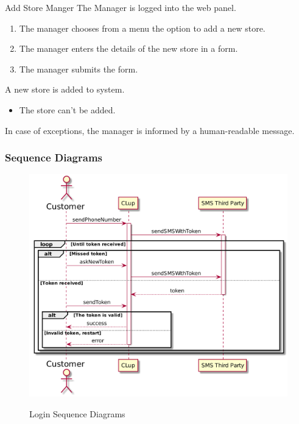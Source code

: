 \usecase
{Add Store}
{Manger}
{The Manager is logged into the web panel.}
{
    \begin{enumerate}
        \item The manager chooses from a menu the option to add a new store.
        \item The manager enters the details of the new store in a form.
        \item The manager submits the form.
    \end{enumerate}
}
{
    A new store is added to system.
}
{
    \begin{itemize}
        \item The store can't be added.
    \end{itemize}
}
{
    In case of exceptions, the manager is informed by a human-readable message.
}


\subsubsection{Sequence Diagrams}


\begin{figure}[H]
    \centering
    \includegraphics[width=1\textwidth]{uml/login.png}
    \label{fig:seqdiag-login}
    \caption{Login Sequence Diagrams}
\end{figure}

